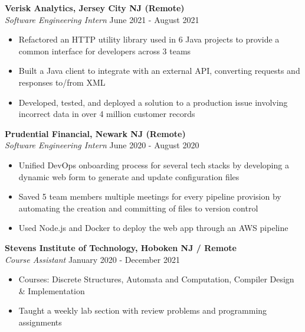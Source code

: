 \documentclass{article}
\begin{document}
\noindent
\textbf{Verisk Analytics, Jersey City NJ (Remote)}\\
\textit{Software Engineering Intern}
\hfill
June 2021 - August 2021\\
\vspace{-1em}
\begin{itemize}
\item Refactored an HTTP utility library used in 6 Java projects to provide a common interface for developers across 3 teams
\item Built a Java client to integrate with an external API, converting requests and responses to/from XML
\item Developed, tested, and deployed a solution to a production issue involving incorrect data in over 4 million customer records



\end{itemize}

\noindent
\textbf{Prudential Financial, Newark NJ (Remote)}\\
\textit{Software Engineering Intern}
\hfill
June 2020 - August 2020\\
\vspace{-1em}
\begin{itemize}
\item Unified DevOps onboarding process for several tech stacks by developing a dynamic web form to generate and update configuration files
\item Saved 5 team members multiple meetings for every pipeline provision by automating the creation and committing of files to version control
\item Used Node.js and Docker to deploy the web app through an AWS pipeline
\end{itemize}

\noindent
\textbf{Stevens Institute of Technology, Hoboken NJ / Remote}\\
\textit{Course Assistant}
\hfill
January 2020 - December 2021\\
\vspace{-1em}
\begin{itemize}
\item Courses: Discrete Structures, Automata and Computation, Compiler Design \& Implementation
\item Taught a weekly lab section with review problems and programming assignments
\end{itemize}
\end{document}
